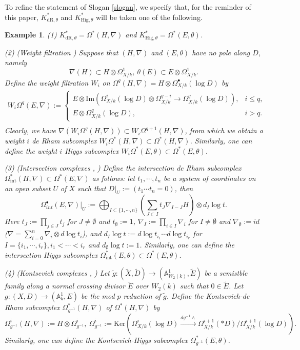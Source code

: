 \documentclass[12pt, a4paper]{article}
\newtheorem{example}{Example}[section]
\begin{document}
To refine the statement of Slogan \ref{slogan}, we specify that, for the reminder of this paper, $K^*_{\mathrm{dR},\theta}$ and $K^*_{\mathrm{Hig},\theta}$ will be taken one of the following.
\begin{example}\label{example MHM}
\upshape
(1) $K^*_{\mathrm{dR},\theta}=\Omega^*(H,\nabla)$ and $K^*_{\mathrm{Hig},\theta}=\Omega^*(E,\theta)$.
   
(2) (Weight filtration \cite[Definition 8.3.19]{CEGT}) Suppose that $(H,\nabla)$ and $(E,\theta)$ have no pole along $D$, namely
    $$
    \nabla(H)\subset H\otimes\Omega^1_{X/k},~\theta(E)\subset E\otimes\Omega^1_{X/k}.
    $$
    Define the weight filtration $W_i$ on $\Omega^q(H,\nabla)=H\otimes\Omega^\bullet_{X/k}(\log D)$ by
 $$
 \begin{array}{c}
 W_i\Omega^q(E,\nabla):=\left\{\begin{matrix}E\otimes\mathrm{Im}(\Omega_{X/k}^i(\log D)\otimes\Omega^{q-i}_{X/k}\to\Omega_{X/k}^q(\log D)),&i\leq q,\\
E\otimes\Omega_{X/k}^q(\log D),&i>q.
 \end{matrix}\right.\\
 \end{array}
 $$
Clearly, we have $\nabla(W_i\Omega^q(H,\nabla))\subset W_i\Omega^{q+1}(H,\nabla)$, from which we obtain a weight $i$ de Rham subcomplex $W_i\Omega^*(H,\nabla)\subset\Omega^*(H,\nabla)$. Similarly, one can define the weight $i$ Higgs subcomplex $W_i\Omega^*(E,\theta)\subset\Omega^*(E,\theta)$.

(3) (Intersection complexes \cite[Definition 8.3.31]{CEGT}, \cite[\S2]{SZ2}) Define the intersection de Rham subcomplex $\Omega^*_\mathrm{int}(H,\nabla)\subset\Omega^*(E,\nabla)$ as follows: let $t_1,\cdots,t_n$ be a system of coordinates on an open subset $U$ of $X$ such that $D|_U:=(t_1\cdots t_n=0)$, then
 $$
 \Omega^\bullet_{int}(E,\nabla)|_U:=\bigoplus_{I\subset\{1,\cdots,n\}}(\sum_{J\subset I}t_J\nabla_{I-J}H)\otimes d_I\log t.
 $$
 Here $t_J:=\prod_{j\in J}t_j$ for $J\neq\emptyset$ and $t_\emptyset:=1$,  $\nabla_I:=\prod_{i\in I}\nabla_i$ for $I\neq\emptyset$ and $\nabla_\emptyset:=id$ ($\nabla=\sum_{i=0}^n\nabla_i\otimes d\log t_i$), and $d_I\log t:=d\log t_{i_1}\cdots d\log t_{i_r}$ for $I=\{i_1,\cdots,i_r\},i_1<\cdots<i_r$ and $d_\emptyset\log t:=1$. Similarly, one can define the intersection Higgs subcomplex $\Omega^*_\mathrm{int}(E,\theta)\subset\Omega^*(E,\theta)$.

(4) (Kontsevich complexes \cite[Definition 2.11]{KKP}, \cite[\S1.3]{ESY}) Let $\tilde g:(\tilde X,\tilde D)\to(\mathbb A_{W_2(k)}^1,\tilde E)$ be a semistble family along a normal crossing divisor $\tilde E$ over $W_2(k)$ such that $0\in \tilde E$. Let $g:(X,D)\to(\mathbb A^1_k,E)$ be the mod $p$ reduction of $\tilde g$. Define the Kontsevich-de Rham subcomplex $\Omega_{g^{-1}}^*(H,\nabla)$ of $\Omega^*(H,\nabla)$ by
$$
\Omega^i_{g^{-1}}(H,\nabla):=H\otimes\Omega^i_{g^{-1}},~\Omega^i_{g^{-1}}:=\mathrm{Ker}(\Omega^i_{X/k}(\log D)\xrightarrow{dg^{-1}\wedge}\Omega^{i+1}_{X/k}(*D)/\Omega^{i+1}_{X/k}(\log D)).
$$
Similarly, one can define the Kontsevich-Higgs subcomplex $\Omega_{g^{-1}}^*(E,\theta)$.
\end{example}
\end{document}
